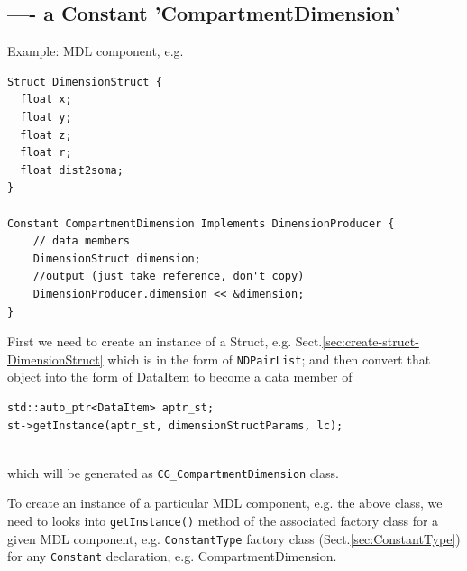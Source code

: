 \subsection{---- a Constant 'CompartmentDimension'}
\label{sec:create-constant-CompartmentDimension}

Example: MDL component, e.g.
\begin{verbatim}
Struct DimensionStruct {
  float x;
  float y;
  float z;
  float r;
  float dist2soma;
}

Constant CompartmentDimension Implements DimensionProducer {
	// data members
	DimensionStruct dimension;
	//output (just take reference, don't copy)
	DimensionProducer.dimension << &dimension;
}
\end{verbatim}

First we need to create an instance of a Struct, e.g.
Sect.\ref{sec:create-struct-DimensionStruct} which is in the form of
\verb!NDPairList!; and then convert that object into the form of DataItem to
become a data member of 
\begin{verbatim}
std::auto_ptr<DataItem> aptr_st;
st->getInstance(aptr_st, dimensionStructParams, lc);


\end{verbatim}

which will be generated as \verb!CG_CompartmentDimension! class.

To create an instance of a particular MDL component, e.g. the above class, we
need to looks into \verb!getInstance()! method of the associated factory class
for a given MDL component, e.g. \verb!ConstantType! factory class
(Sect.\ref{sec:ConstantType}) for any \verb!Constant! declaration, e.g.
CompartmentDimension.

